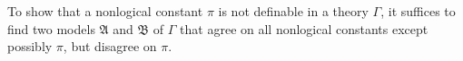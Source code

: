 To show that a nonlogical constant $\pi$ is not definable in a theory $\Gamma$, it suffices to find two models $\mathfrak{A}$ and $\mathfrak{B}$ of $\Gamma$ that agree on all nonlogical constants except possibly $\pi$, but disagree on $\pi$.
